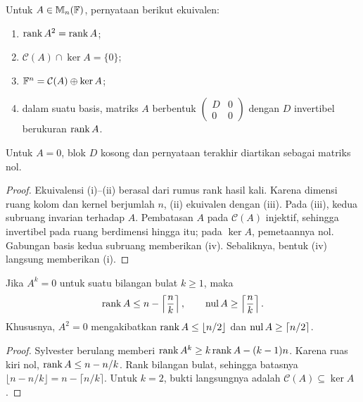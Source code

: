 \begin{prop}
    \label{rank:stabil-awal}
    Untuk $A\in\mathbb{M}_n(\mathbb{F})$, pernyataan berikut ekuivalen:
    \begin{enumerate}[label=(\roman*),nosep]
        \item $\operatorname{rank} A^2=\operatorname{rank} A$;
        \item $\mathcal C(A)\cap\ker A=\{0\}$;
        \item $\mathbb{F}^n=\mathcal C(A)\oplus\ker A$;
        \item dalam suatu basis, matriks $A$ berbentuk
            $\begin{pmatrix}D&0\\0&0\end{pmatrix}$ dengan $D$ invertibel
            berukuran $\operatorname{rank} A$.
    \end{enumerate}
    Untuk $A=0$, blok $D$ kosong dan pernyataan terakhir diartikan
    sebagai matriks nol.
\end{prop}
\begin{proof}
    Ekuivalensi (i)--(ii) berasal dari rumus rank hasil kali.
    Karena dimensi ruang kolom dan kernel berjumlah $n$, (ii) ekuivalen
    dengan (iii). Pada (iii), kedua subruang invarian terhadap $A$.
    Pembatasan $A$ pada $\mathcal C(A)$ injektif, sehingga invertibel
    pada ruang berdimensi hingga itu; pada $\ker A$, pemetaannya nol.
    Gabungan basis kedua subruang memberikan (iv).
    Sebaliknya, bentuk (iv) langsung memberikan (i).
\end{proof}

\begin{prop}
    \label{rank:nilpoten}
    Jika $A^k=0$ untuk suatu bilangan bulat $k\ge1$, maka
    \[
        \operatorname{rank} A\le n-\left\lceil\frac nk\right\rceil,
        \qquad \operatorname{nul} A\ge\left\lceil\frac nk\right\rceil.
    \]
    Khususnya, $A^2=0$ mengakibatkan
    $\operatorname{rank} A\le\lfloor n/2\rfloor$ dan $\operatorname{nul} A\ge\lceil n/2\rceil$.
\end{prop}
\begin{proof}
    Sylvester berulang memberi
    $\operatorname{rank} A^k\ge k\operatorname{rank} A-(k-1)n$.
    Karena ruas kiri nol, $\operatorname{rank} A\le n-n/k$.
    Rank bilangan bulat, sehingga batasnya
    $\lfloor n-n/k\rfloor=n-\lceil n/k\rceil$.
    Untuk $k=2$, bukti langsungnya adalah
    $\mathcal C(A)\subseteq\ker A$.
\end{proof}

